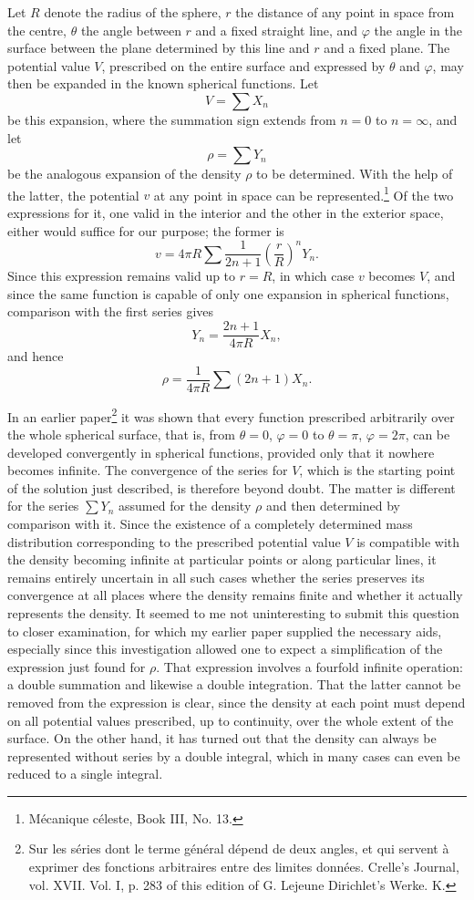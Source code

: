 \documentclass[11pt]{article}
\begin{document}
Let $R$ denote the radius of the sphere, $r$ the distance of any point in space from the centre, $\theta$ the angle between $r$ and a fixed straight line, and $\varphi$ the angle in the surface between the plane determined by this line and $r$ and a fixed plane. The potential value $V$, prescribed on the entire surface and expressed by $\theta$ and $\varphi$, may then be expanded in the known spherical functions. Let
\[
  V=\sum X_n
\]
be this expansion, where the summation sign extends from $n=0$ to $n=\infty$, and let
\[
  \rho=\sum Y_n
\]
be the analogous expansion of the density $\rho$ to be determined. With the help of the latter, the potential $v$ at any point in space can be represented.\footnote{Mécanique céleste, Book III, No. 13.} Of the two expressions for it, one valid in the interior and the other in the exterior space, either would suffice for our purpose; the former is
\[
 v=4\pi R\sum \frac{1}{2n+1}\left(\frac rR\right)^nY_n.
\]
Since this expression remains valid up to $r=R$, in which case $v$ becomes $V$, and since the same function is capable of only one expansion in spherical functions, comparison with the first series gives
\[
  Y_n=\frac{2n+1}{4\pi R}X_n,
\]
and hence
\[
  \rho=\frac{1}{4\pi R}\sum(2n+1)X_n.
\]

In an earlier paper\footnote{Sur les séries dont le terme général dépend de deux angles, et qui servent à exprimer des fonctions arbitraires entre des limites données. Crelle's Journal, vol. XVII. Vol. I, p. 283 of this edition of G. Lejeune Dirichlet's Werke. K.} it was shown that every function prescribed arbitrarily over the whole spherical surface, that is, from $\theta=0$, $\varphi=0$ to $\theta=\pi$, $\varphi=2\pi$, can be developed convergently in spherical functions, provided only that it nowhere becomes infinite. The convergence of the series for $V$, which is the starting point of the solution just described, is therefore beyond doubt. The matter is different for the series $\sum Y_n$ assumed for the density $\rho$ and then determined by comparison with it. Since the existence of a completely determined mass distribution corresponding to the prescribed potential value $V$ is compatible with the density becoming infinite at particular points or along particular lines, it remains entirely uncertain in all such cases whether the series preserves its convergence at all places where the density remains finite and whether it actually represents the density. It seemed to me not uninteresting to submit this question to closer examination, for which my earlier paper supplied the necessary aids, especially since this investigation allowed one to expect a simplification of the expression just found for $\rho$. That expression involves a fourfold infinite operation: a double summation and likewise a double integration. That the latter cannot be removed from the expression is clear, since the density at each point must depend on all potential values prescribed, up to continuity, over the whole extent of the surface. On the other hand, it has turned out that the density can always be represented without series by a double integral, which in many cases can even be reduced to a single integral.
\end{document}
